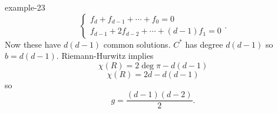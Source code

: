 \documentclass[10pt,]{book}
\numberwithin{equation}{section}
\begin{document}
\begin{example}{}{example-23}
%
\begin{equation*}
\begin{cases}  f_d + f_{d-1} + \cdots + f_0 = 0 \\ f_{d-1} + 2f_{d-2} + \cdots + (d-1) f_1 = 0\end{cases}\text{.}
\end{equation*}
Now these have \(d(d-1)\) common solutions. \(C^*\) has degree \(d(d-1)\) so \(b = d(d-1)\). Riemann-Hurwitz implies%
\begin{equation*}
\chi(R) = 2\deg \pi - d(d-1)
\end{equation*}
%
\begin{equation*}
\chi(R) = 2d - d(d-1)
\end{equation*}
so%
\begin{equation*}
g=  \frac{(d-1)(d-2)}{2}\text{.}
\end{equation*}
%
\end{example}
%
%
\typeout{************************************************}
\typeout{************************************************}
%
\end{document}
